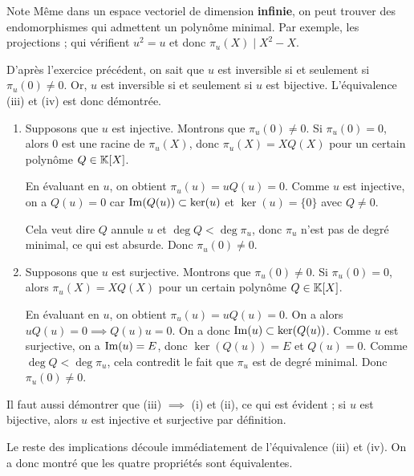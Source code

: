 \documentclass[11pt,a4paper]{report}
\begin{document}
\begin{customenv}{}{Note}
    Même dans un espace vectoriel de dimension \textbf{infinie}, on peut trouver des endomorphismes qui admettent un polynôme minimal. Par exemple, les projections ; qui vérifient $u^2 = u$ et donc $\pi_u(X) \mid X^2 - X$.
\end{customenv}

\begin{correction}
    D'après l'exercice précédent, on sait que $u$ est inversible si et seulement si $\pi_u(0) \ne 0$. Or, $u$ est inversible si et seulement si $u$ est bijective. L'équivalence (iii) et (iv) est donc démontrée.

    \begin{enumerate}[label=(\roman*)]
        \item Supposons que $u$ est injective. Montrons que $\pi_u(0) \ne 0$. Si $\pi_u(0) = 0$, alors $0$ est une racine de $\pi_u(X)$, donc $\pi_u(X) = XQ(X)$ pour un certain polynôme $Q \in \mathbb{K}[X]$.
        
        En évaluant en $u$, on obtient $\pi_u(u) = uQ(u) = 0$. Comme $u$ est injective, on a $Q(u) = 0$ car $\mathrm{Im}(Q(u)) \subset \ker(u)$ et $\ker(u) = \{0\}$ avec $Q \ne 0$.
        
        Cela veut dire $Q$ annule $u$ et $\deg Q < \deg \pi_u$, donc $\pi_u$ n'est pas de degré minimal, ce qui est absurde. Donc $\pi_u(0) \ne 0$.

        \item Supposons que $u$ est surjective. Montrons que $\pi_u(0) \ne 0$. Si $\pi_u(0) = 0$, alors $\pi_u(X) = XQ(X)$ pour un certain polynôme $Q \in \mathbb{K}[X]$.
        
        En évaluant en $u$, on obtient $\pi_u(u) = uQ(u) = 0$. On a alors $uQ(u) = 0 \implies Q(u)u = 0$. On a donc $\mathrm{Im}(u) \subset \ker(Q(u))$. Comme $u$ est surjective, on a $\mathrm{Im}(u) = E$, donc $\ker(Q(u)) = E$ et $Q(u) = 0$. Comme $\deg Q < \deg \pi_u$, cela contredit le fait que $\pi_u$ est de degré minimal. Donc $\pi_u(0) \ne 0$.
    \end{enumerate}
    Il faut aussi démontrer que (iii) $\implies$ (i) et (ii), ce qui est évident ; si $u$ est bijective, alors $u$ est injective et surjective par définition.

    Le reste des implications découle immédiatement de l'équivalence (iii) et (iv). On a donc montré que les quatre propriétés sont équivalentes.
\end{correction}
\end{document}
